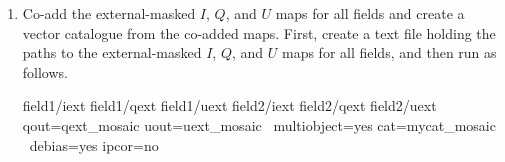 \begin{enumerate}
\item Co-add the external-masked $I$, $Q$, and $U$ maps for all fields and create a vector
catalogue from  the co-added maps. First, create a text file holding the paths to the
external-masked  $I$, $Q$, and $U$ maps  for all fields, and then run 
as follows.

 \begin{terminalv}
        field1/iext
        field1/qext
        field1/uext
        field2/iext
        field2/qext
        field2/uext
                  qout=qext_mosaic uout=uext_mosaic \
                  multiobject=yes cat=mycat_mosaic \
                  debias=yes ipcor=no
\end{terminalv}

\end{enumerate}
